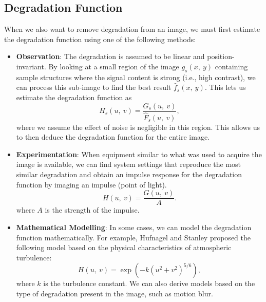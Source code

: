 \documentclass{article}
\begin{document}
\subsection{Degradation Function}
When we also want to remove degradation from an image, we must first
estimate the degradation function using one of the following methods:
\begin{itemize}
    \item \textbf{Observation}: The degradation is assumed to be linear
          and position-invariant. By looking at a small region of the image
          \(g_s\left( x,\: y \right)\) containing sample structures where
          the signal content is strong (i.e., high contrast), we can process
          this sub-image to find the best result \(\hat{f}_s\left( x,\: y \right)\).
          This lets us estimate the degradation function as
          \begin{equation*}
              H_s\left( u,\: v \right) = \frac{G_s\left( u,\: v \right)}{\hat{F}_s\left( u,\: v \right)},
          \end{equation*}
          where we assume the effect of noise is negligible in this region.
          This allows us to then deduce the degradation function for the
          entire image.
    \item \textbf{Experimentation}: When equipment similar to what was
          used to acquire the image is available, we can find system settings
          that reproduce the most similar degradation and obtain an impulse
          response for the degradation function by imaging an impulse (point
          of light).
          \begin{equation*}
              H\left( u,\: v \right) = \frac{G\left( u,\: v \right)}{A}.
          \end{equation*}
          where \(A\) is the strength of the impulse.
    \item \textbf{Mathematical Modelling}: In some cases, we can model
          the degradation function mathematically. For example, Hufnagel and
          Stanley proposed the following model based on the physical
          characteristics of atmospheric turbulence:
          \begin{equation*}
              H\left( u,\: v \right) = \exp\left( -k \left( u^2 + v^2 \right)^{5/6} \right),
          \end{equation*}
          where \(k\) is the turbulence constant. We can also derive models
          based on the type of degradation present in the image, such as
          motion blur.

\end{itemize}
\end{document}
